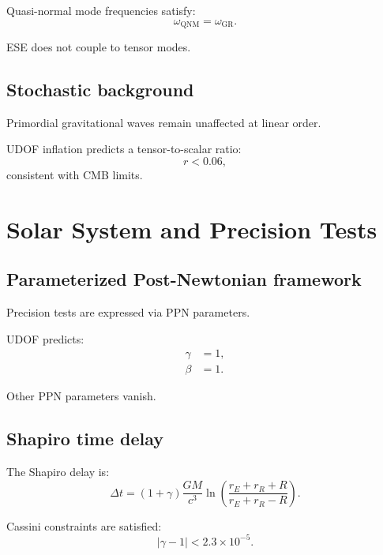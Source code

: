 \documentclass[11pt]{book}
\begin{document}
Quasi-normal mode frequencies satisfy:
\begin{equation}
\omega_{\mathrm{QNM}} = \omega_{\mathrm{GR}}.
\end{equation}

ESE does not couple to tensor modes.

\section{Stochastic background}

Primordial gravitational waves remain unaffected at linear order.

UDOF inflation predicts a tensor-to-scalar ratio:
\begin{equation}
r < 0.06,
\end{equation}
consistent with CMB limits.

\chapter{Solar System and Precision Tests}

\section{Parameterized Post-Newtonian framework}

Precision tests are expressed via PPN parameters.

UDOF predicts:
\begin{align}
\gamma &= 1, \\
\beta &= 1.
\end{align}

Other PPN parameters vanish.

\section{Shapiro time delay}

The Shapiro delay is:
\begin{equation}
\Delta t =
(1 + \gamma)
\frac{GM}{c^3}
\ln \left(
\frac{r_E + r_R + R}{r_E + r_R - R}
\right).
\end{equation}

Cassini constraints are satisfied:
\begin{equation}
|\gamma - 1| < 2.3 \times 10^{-5}.
\end{equation}
\end{document}
